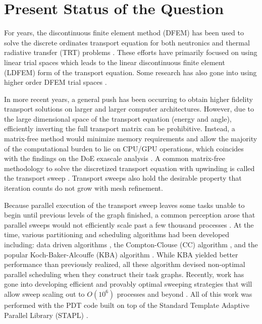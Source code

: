 \documentclass[11pt]{article}
\begin{document}
\section{Present Status of the Question}
\label{sec::PS}

For years, the discontinuous finite element method (DFEM) has been used to solve the discrete ordinates transport equation for both neutronics and thermal radiative transfer (TRT) problems \cite{hill1975onetran,reed1973triplet,larsen1982finite,larsen1987asymptotic,larsen1989asymptotic,adams2001dfem}. These efforts have primarily focused on using linear trial spaces which leads to the linear discontinuous finite element (LDFEM) form of the transport equation. Some research has also gone into using higher order DFEM trial spaces \cite{walters1986relation,hennart1995generalizedI,hennart1995generalizedII,wang2009convergence,wang2009adaptive,warsa1999p,maginot2013characterization,maginot2015lumping}. 

In more recent years, a general push has been occurring to obtain higher fidelity transport solutions on larger and larger computer architectures. However, due to the large dimensional space of the transport equation (energy and angle), efficiently inverting the full transport matrix can be prohibitive. Instead, a matrix-free method would minimize memory requirements and allow the majority of the computational burden to lie on CPU/GPU operations, which coincides with the findings on the DoE exascale analysis \cite{bergman2008exascale}. A common matrix-free methodology to solve the discretized transport equation with upwinding is called the transport sweep \cite{ref::adams_larsen_iter_methods}. Transport sweeps also hold the desirable property that iteration counts do not grow with mesh refinement.

Because parallel execution of the transport sweep leaves some tasks unable to begin until previous levels of the graph finished, a common perception arose that parallel sweeps would not efficiently scale past a few thousand processes \cite{evans2010denovo,zerr2011solution}. At the time, various partitioning and scheduling algorithms had been developed including: data driven algorithms \cite{dorr1996concurrent,brown1999performing,brown1999performing}, the Compton-Clouse (CC) algorithm \cite{compton2005tiling}, and the popular Koch-Baker-Alcouffe (KBA) algorithm \cite{ref::KBA,baker1998s}. While KBA yielded better performance than previously realized, all these algorithm devised non-optimal parallel scheduling when they construct their task graphs. Recently, work has gone into developing efficient and provably optimal sweeping strategies that will allow sweep scaling out to $O(10^6)$ processes and beyond \cite{ref::eff_sweeps,adams2013provably}. All of this work was performed with the PDT code built on top of the Standard Template Adaptive Parallel Library (STAPL) \cite{buss2010stapl,tanase2011stapl,buss2011stapl,fidel2013stapl}.
\end{document}
